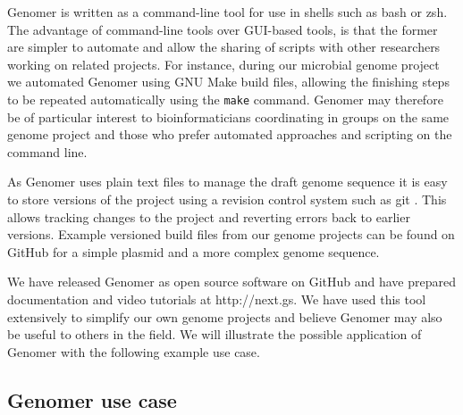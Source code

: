 \documentclass[10pt]{article}
\begin{document}
Genomer is written as a command-line tool for use in shells such as bash or
zsh. The advantage of command-line tools over GUI-based tools, is that the
former are simpler to automate and allow the sharing of scripts with other
researchers working on related projects. For instance, during our microbial
genome project we automated Genomer using GNU Make build files, allowing the
finishing steps to be repeated automatically using the \verb+make+ command.
Genomer may therefore be of particular interest to bioinformaticians
coordinating in groups on the same genome project and those who prefer
automated approaches and scripting on the command line.

As Genomer uses plain text files to manage the draft genome sequence it is easy
to store versions of the project using a revision control system such as git
\cite{git-scm}. This allows tracking changes to the project and reverting
errors back to earlier versions. Example versioned build files from our genome
projects can be found on GitHub for a simple plasmid \cite{plasmid-github} and
a more complex genome \cite{genome-github} sequence.

We have released Genomer as open source software on GitHub
\cite{genomer-github} and have prepared documentation and video tutorials at
http://next.gs. We have used this tool extensively to simplify our own genome
projects and believe Genomer may also be useful to others in the field. We will
illustrate the possible application of Genomer with the following example use
case.

\subsection*{Genomer use case}
\end{document}
